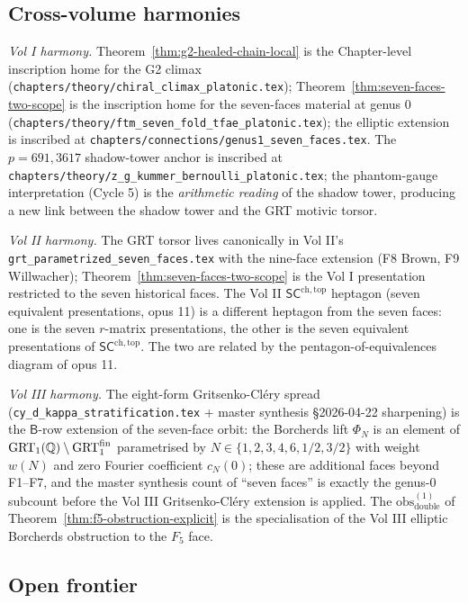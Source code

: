 \subsection*{Cross-volume harmonies}

\emph{Vol I harmony.}
Theorem~\ref{thm:g2-healed-chain-local} is the Chapter-level inscription
home for the G2 climax (\texttt{chapters/theory/chiral\_climax\_platonic.tex});
Theorem~\ref{thm:seven-faces-two-scope} is the inscription home for the
seven-faces material at genus 0
(\texttt{chapters/theory/ftm\_seven\_fold\_tfae\_platonic.tex}); the
elliptic extension is inscribed at
\texttt{chapters/connections/genus1\_seven\_faces.tex}. The
$p = 691, 3617$ shadow-tower anchor is inscribed at
\texttt{chapters/theory/z\_g\_kummer\_bernoulli\_platonic.tex}; the
phantom-gauge interpretation (Cycle 5) is the \emph{arithmetic
reading} of the shadow tower, producing a new link between the shadow
tower and the GRT motivic torsor.

\emph{Vol II harmony.}
The GRT torsor lives canonically in Vol II's
\texttt{grt\_parametrized\_seven\_faces.tex} with the nine-face
extension (F8 Brown, F9 Willwacher); Theorem~\ref{thm:seven-faces-two-scope}
is the Vol I presentation restricted to the seven historical faces.
The Vol II $\mathsf{SC}^{\mathrm{ch,top}}$ heptagon (seven equivalent
presentations, opus 11) is a different heptagon from the seven faces:
one is the seven $r$-matrix presentations, the other is the seven
equivalent presentations of $\mathsf{SC}^{\mathrm{ch,top}}$. The two are
related by the pentagon-of-equivalences diagram of opus 11.

\emph{Vol III harmony.}
The eight-form Gritsenko-Cl\'ery spread
(\texttt{cy\_d\_kappa\_stratification.tex} + master synthesis
\S2026-04-22 sharpening) is the $\mathsf{B}$-row extension of the
seven-face orbit: the Borcherds lift $\Phi_N$ is an element of
$\mathrm{GRT}_1(\mathbb{Q}) \setminus \mathrm{GRT}_1^{\mathrm{fin}}$ parametrised by $N \in \{1, 2, 3, 4, 6, 1/2, 3/2\}$
with weight $w(N)$ and zero Fourier coefficient $c_N(0)$; these are
additional faces beyond F1--F7, and the master synthesis count of
``seven faces'' is exactly the genus-$0$ subcount before the Vol III
Gritsenko-Cl\'ery extension is applied. The $\mathrm{obs}^{(1)}_{\mathrm{double}}$
of Theorem~\ref{thm:f5-obstruction-explicit} is the specialisation of
the Vol III elliptic Borcherds obstruction to the $F_5$ face.

\subsection*{Open frontier}

